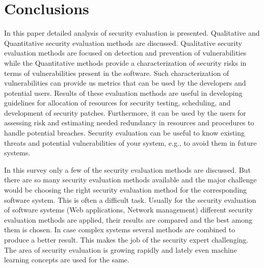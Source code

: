 \documentclass[pdftex,english,oribibl]{llncs}
\begin{document}
\section{Conclusions}\label{sec:conclusions}
In this paper detailed analysis of security evaluation is presented. Qualitative and Quantitative security evaluation methods are discussed. Qualitative security evaluation methods are focused on detection and prevention of vulnerabilities while the Quantitative methods provide a characterization of security risks in terms of vulnerabilities present in the software. Such characterization of vulnerabilities can provide us metrics that can be used by the developers and potential users. Results of these evaluation methods are useful in developing guidelines for allocation of resources for security testing, scheduling, and development of security patches. Furthermore, it can be used by the users for assessing risk and estimating needed redundancy in resources and procedures to handle potential breaches. Security evaluation can be useful to know existing threats and potential vulnerabilities of your system, e.g., to avoid them in future systems. 

In this survey only a few of the security evaluation methods are discussed. But there are so many security evaluation methods available and the major challenge would be choosing the right security evaluation method for the corresponding software system. This is often a difficult task. Usually for the security evaluation of software systems (Web applications, Network management) different security evaluation methods are applied, their results are compared and the best among them is chosen. In case complex systems several methods are combined to produce a better result. This makes the job of the security expert challenging. The area of security evaluation is growing rapidly and lately even machine learning concepts are used for the same.  


\end{document}
